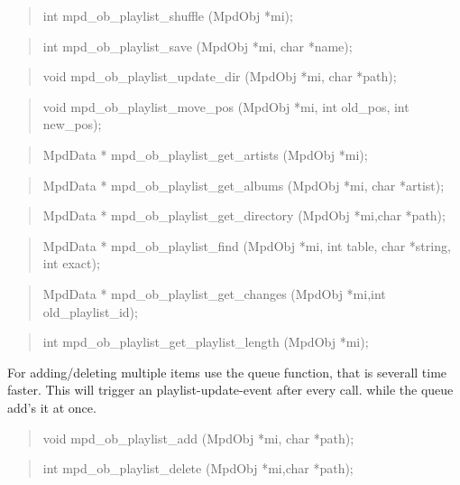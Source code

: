 \documentclass[a4paper,11pt]{article}
\begin{document}
	\begin{quote}
	int   mpd\_ob\_playlist\_shuffle   (MpdObj *mi);
	\end{quote}
	
	\begin{quote}
	int   mpd\_ob\_playlist\_save   (MpdObj *mi, char *name);
	\end{quote}
	
	\begin{quote}
	void   mpd\_ob\_playlist\_update\_dir  (MpdObj *mi, char *path);
	\end{quote}
	
	\begin{quote}
	void   mpd\_ob\_playlist\_move\_pos  (MpdObj *mi, int old\_pos, int new\_pos);
	\end{quote}
	
	\begin{quote}
	MpdData *  mpd\_ob\_playlist\_get\_artists  (MpdObj *mi);
	\end{quote}
	
	\begin{quote}
	MpdData * mpd\_ob\_playlist\_get\_albums  (MpdObj *mi, char *artist);
	\end{quote}
	
	\begin{quote}
	MpdData *  mpd\_ob\_playlist\_get\_directory  (MpdObj *mi,char *path);
	\end{quote}
	
	\begin{quote}
	MpdData *  mpd\_ob\_playlist\_find   (MpdObj *mi, int table, char *string, int exact);
	\end{quote}
	
	\begin{quote}
	MpdData *  mpd\_ob\_playlist\_get\_changes  (MpdObj *mi,int old\_playlist\_id);
	\end{quote}
	\begin{quote}
	int  mpd\_ob\_playlist\_get\_playlist\_length (MpdObj *mi);
	\end{quote}
	
	For adding/deleting multiple items use the queue function, that is severall time faster.
	This will trigger an playlist-update-event after every call. while the queue add's it at once.
	\begin{quote}
	void  mpd\_ob\_playlist\_add   (MpdObj *mi, char *path);
	\end{quote}
	
	\begin{quote}
	int   mpd\_ob\_playlist\_delete   (MpdObj *mi,char *path);
	\end{quote}
	
\end{document}
